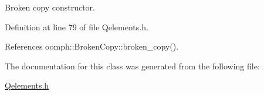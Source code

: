 Broken copy constructor. 



Definition at line 79 of file Qelements.\+h.



References oomph\+::\+Broken\+Copy\+::broken\+\_\+copy().



The documentation for this class was generated from the following file\+:\begin{DoxyCompactItemize}
\item 
\hyperlink{Qelements_8h}{Qelements.\+h}\end{DoxyCompactItemize}
